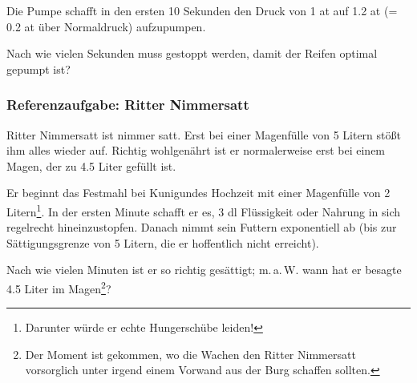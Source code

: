 Die Pumpe schafft in den ersten 10 Sekunden den Druck von 1 at auf 1.2
at (= 0.2 at über Normaldruck) aufzupumpen.

Nach wie vielen Sekunden muss gestoppt werden, damit der Reifen
optimal gepumpt ist?

\newpage

\subsubsection{Referenzaufgabe: Ritter
  Nimmersatt}
Ritter Nimmersatt ist nimmer satt. Erst bei einer Magenfülle von
5 Litern stößt ihm alles wieder auf. Richtig wohlgenährt ist er
normalerweise erst bei einem Magen, der zu 4.5 Liter gefüllt ist.

Er beginnt das Festmahl bei Kunigundes Hochzeit mit einer Magenfülle
von 2 Litern\footnote{Darunter würde er echte Hungerschübe
  leiden!}. In der ersten Minute schafft er es, 3 dl Flüssigkeit oder Nahrung
in sich regelrecht hineinzustopfen. Danach nimmt sein Futtern
exponentiell ab (bis zur Sättigungsgrenze von 5 Litern, die er
hoffentlich nicht erreicht).

Nach wie vielen Minuten ist er so richtig gesättigt; m.\,a.\,W. wann
hat er besagte 4.5 Liter im Magen\footnote{Der Moment ist gekommen, wo
  die Wachen den Ritter Nimmersatt vorsorglich unter irgend einem Vorwand aus der Burg schaffen sollten.}?



\newpage

